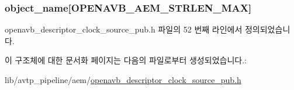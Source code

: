 \subsubsection[{\texorpdfstring{object\+\_\+name}{object_name}}]{ object\+\_\+name\mbox{[}{\bf O\+P\+E\+N\+A\+V\+B\+\_\+\+A\+E\+M\+\_\+\+S\+T\+R\+L\+E\+N\+\_\+\+M\+AX}\mbox{]}}\hypertarget{structopenavb__aem__descriptor__clock__source__t_a5e98aba8105a7a6d82fac41816c83da3}{}\label{structopenavb__aem__descriptor__clock__source__t_a5e98aba8105a7a6d82fac41816c83da3}


openavb\+\_\+descriptor\+\_\+clock\+\_\+source\+\_\+pub.\+h 파일의 52 번째 라인에서 정의되었습니다.



이 구조체에 대한 문서화 페이지는 다음의 파일로부터 생성되었습니다.\+:\begin{DoxyCompactItemize}
\item 
lib/avtp\+\_\+pipeline/aem/\hyperlink{openavb__descriptor__clock__source__pub_8h}{openavb\+\_\+descriptor\+\_\+clock\+\_\+source\+\_\+pub.\+h}\end{DoxyCompactItemize}
